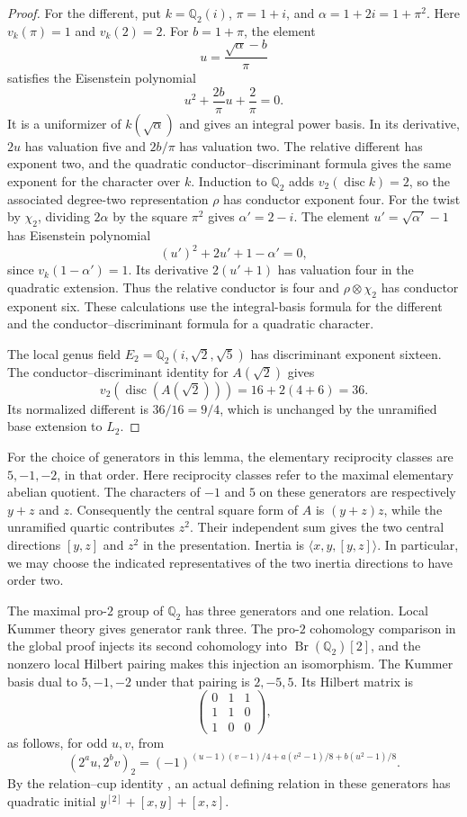 \begin{proof}
For the different, put $k=\mathbb Q_2(i)$, $\pi=1+i$, and
$\alpha=1+2i=1+\pi^2$. Here $v_k(\pi)=1$ and $v_k(2)=2$.
For $b=1+\pi$, the element
\[
 u=\frac{\sqrt\alpha-b}{\pi}
\]
satisfies the Eisenstein polynomial
\[
 u^2+\frac{2b}{\pi}u+\frac2\pi=0.
\]
It is a uniformizer of $k(\sqrt\alpha)$ and gives an integral power
basis. In its derivative, $2u$ has valuation five and $2b/\pi$ has
valuation two. The relative different has exponent two, and the quadratic
conductor--discriminant formula gives the same exponent for the
character over $k$. Induction to
$\mathbb Q_2$ adds $v_2(\operatorname{disc}k)=2$, so the associated
degree-two representation $\rho$ has conductor exponent four.
For the twist by $\chi_2$, dividing $2\alpha$ by the square $\pi^2$
gives $\alpha'=2-i$. The element $u'=\sqrt{\alpha'}-1$ has Eisenstein
polynomial
\[
 (u')^2+2u'+1-\alpha'=0,
\]
since $v_k(1-\alpha')=1$. Its derivative $2(u'+1)$ has valuation four
in the quadratic extension. Thus the relative conductor is four and
$\rho\otimes\chi_2$ has conductor exponent six. These calculations
use the integral-basis formula for the different and the
conductor--discriminant formula for a quadratic character.

The local genus field $E_2=\mathbb Q_2(i,\sqrt2,\sqrt5)$ has
discriminant exponent sixteen. The conductor--discriminant identity for
$A(\sqrt2)$ gives
\[
 v_2(\operatorname{disc}(A(\sqrt2)))=16+2(4+6)=36.
\]
Its normalized different is $36/16=9/4$, which is unchanged by the
unramified base extension to $L_2$.
\end{proof}

For the choice of generators in this lemma, the elementary reciprocity
classes are $5,-1,-2$, in that order. Here reciprocity classes refer to the
maximal elementary abelian quotient. The characters of $-1$ and $5$
on these generators are respectively $y+z$ and $z$. Consequently the
central square form of $A$ is $(y+z)z$, while the unramified quartic
contributes $z^2$. Their independent sum gives the two central directions
$[y,z]$ and $z^2$ in the presentation. Inertia is
$\langle x,y,[y,z]\rangle$. In particular, we may choose the indicated
representatives of the two inertia directions to have order two.

The maximal pro-$2$ group of $\mathbb Q_2$ has three generators and
one relation. Local Kummer theory gives generator rank three.
The pro-$2$ cohomology comparison in the global proof injects its
second cohomology into $\operatorname{Br}(\mathbb Q_2)[2]$, and the
nonzero local Hilbert pairing makes this injection an isomorphism.
The Kummer basis dual to $5,-1,-2$ under that pairing is $2,-5,5$.
Its Hilbert matrix is
\[
 \begin{pmatrix}0&1&1\\1&1&0\\1&0&0\end{pmatrix},
\]
as follows, for odd $u,v$, from
\[
 (2^a u,2^b v)_2
 =(-1)^{(u-1)(v-1)/4+a(v^2-1)/8+b(u^2-1)/8}.
\]
By the relation--cup identity \cite[Proposition~3.2]{Quadrelli2021},
an actual defining relation in these generators has quadratic initial
$y^{[2]}+[x,y]+[x,z]$.

